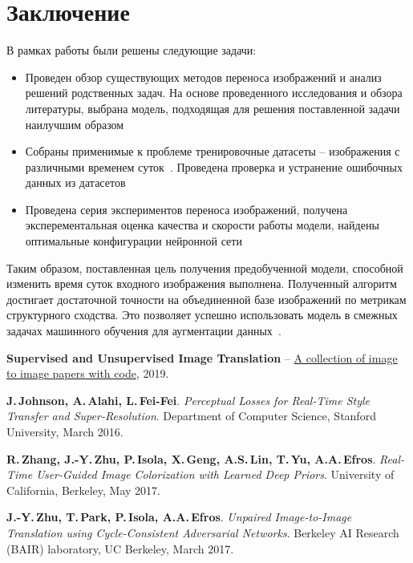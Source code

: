 \documentclass[11pt,a4paper]{extarticle}
\begin{document}
{\newpage
\section{Заключение}\label{sec:conclusion}

	В рамках работы были решены следующие задачи:
	
	\begin{itemize}
		\item Проведен обзор существующих методов переноса изображений и анализ решений родственных задач. На основе проведенного исследования и обзора литературы, выбрана модель, подходящая для решения поставленной задачи наилучшим образом
		\item Собраны применимые к проблеме тренировочные датасеты -- изображения с различными временем суток~\cite{data:nexet,data:bdd100k}. Проведена проверка и устранение ошибочных данных из датасетов
		\item Проведена серия экспериментов переноса изображений, получена эксперементальная оценка качества и скорости работы модели, найдены оптимальные конфигурации нейронной сети
	\end{itemize}
	Таким образом, поставленная цель получения предобученной модели, способной изменить время суток входного изображения выполнена.
	Полученный алгоритм достигает достаточной точности на объединенной базе изображений по метрикам структурного сходства.
	Это позволяет успешно использовать модель в смежных задачах машинного обучения для аугментации данных~\cite{disser_augmentation}. 

\newpage
\begin{thebibliography}{00}

	
	\textbf{Supervised and Unsupervised Image Translation} --
	\href{https://github.com/lzhbrian/image-to-image-papers}{A collection of image to image papers with code},
	2019.

	\textbf{J.\,Johnson, A.\,Alahi, L.\,Fei-Fei}.
	\emph{Perceptual Losses for Real-Time Style Transfer and Super-Resolution}.
	Department of Computer Science, Stanford University,
	March 2016.

	\textbf{R.\,Zhang, J.-Y.\,Zhu, P.\,Isola, X.\,Geng, A.S.\,Lin, T.\,Yu, A.A.\,Efros}.
	\emph{Real-Time User-Guided Image Colorization with Learned Deep Priors}.
	University of California, Berkeley,
	May 2017.

	\textbf{J.-Y.\,Zhu, T.\,Park, P.\,Isola, A.A.\,Efros}.
	\emph{Unpaired Image-to-Image Translation using Cycle-Consistent Adversarial Networks}.
	Berkeley AI Research (BAIR) laboratory, UC Berkeley,
	March 2017.


\end{thebibliography}}
\end{document}

